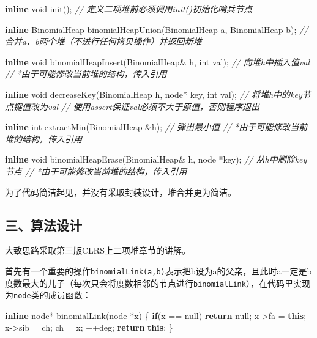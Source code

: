 \documentclass[]{article}
\newenvironment{Shaded}{}{}
\newcommand{\CommentTok}[1]{\textcolor[rgb]{0.38,0.63,0.69}{\textit{#1}}}
\newcommand{\ControlFlowTok}[1]{\textcolor[rgb]{0.00,0.44,0.13}{\textbf{#1}}}
\newcommand{\DataTypeTok}[1]{\textcolor[rgb]{0.56,0.13,0.00}{#1}}
\newcommand{\KeywordTok}[1]{\textcolor[rgb]{0.00,0.44,0.13}{\textbf{#1}}}
\newcommand{\NormalTok}[1]{#1}
\begin{document}
\begin{Shaded}
\begin{Highlighting}[]
\KeywordTok{inline} \DataTypeTok{void}\NormalTok{ init();}
\CommentTok{// 定义二项堆前必须调用init()初始化哨兵节点}

\KeywordTok{inline}\NormalTok{ BinomialHeap binomialHeapUnion(BinomialHeap a, BinomialHeap b);}
\CommentTok{// 合并a、b两个堆（不进行任何拷贝操作）并返回新堆}

\KeywordTok{inline} \DataTypeTok{void}\NormalTok{ binomialHeapInsert(BinomialHeap& h, }\DataTypeTok{int}\NormalTok{ val);}
\CommentTok{// 向堆h中插入值val}
\CommentTok{// *由于可能修改当前堆的结构，传入引用}

\KeywordTok{inline} \DataTypeTok{void}\NormalTok{ decreaseKey(BinomialHeap h, node* key, }\DataTypeTok{int}\NormalTok{ val);}
\CommentTok{// 将堆h中的key节点键值改为val}
\CommentTok{// 使用assert保证val必须不大于原值，否则程序退出}

\KeywordTok{inline} \DataTypeTok{int}\NormalTok{ extractMin(BinomialHeap &h);}
\CommentTok{// 弹出最小值}
\CommentTok{// *由于可能修改当前堆的结构，传入引用}

\KeywordTok{inline} \DataTypeTok{void}\NormalTok{ binomialHeapErase(BinomialHeap& h, node *key);}
\CommentTok{// 从h中删除key节点}
\CommentTok{// *由于可能修改当前堆的结构，传入引用}
\end{Highlighting}
\end{Shaded}

为了代码简洁起见，并没有采取封装设计，堆合并更为简洁。

\hypertarget{header-n17}{%
\subsection{三、算法设计}\label{header-n17}}

大致思路采取第三版CLRS上二项堆章节的讲解。

首先有一个重要的操作\texttt{binomialLink(a,b)}表示把b设为a的父亲，且此时a一定是b度数最大的儿子（每次只会将度数相邻的节点进行\texttt{binomialLink}），在代码里实现为\texttt{node}类的成员函数：

\begin{Shaded}
\begin{Highlighting}[]
\KeywordTok{inline}\NormalTok{ node* binomialLink(node *x) \{}
    \ControlFlowTok{if}\NormalTok{(x == null) }\ControlFlowTok{return}\NormalTok{ null;}
\NormalTok{    x->fa = }\KeywordTok{this}\NormalTok{;}
\NormalTok{    x->sib = ch;}
\NormalTok{    ch = x;}
\NormalTok{    ++deg;}
    \ControlFlowTok{return} \KeywordTok{this}\NormalTok{;}
\NormalTok{\}}
\end{Highlighting}
\end{Shaded}
\end{document}
